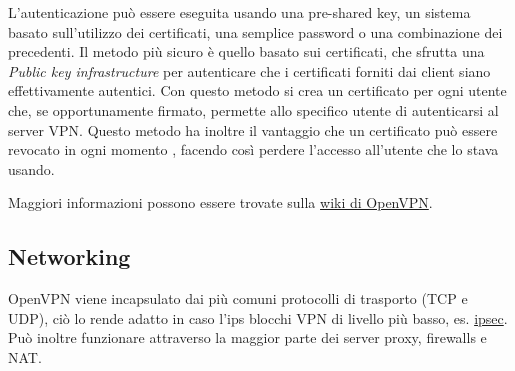 L'autenticazione può essere eseguita usando una pre-shared key, un sistema basato sull'utilizzo dei certificati, una semplice password o una combinazione dei precedenti. Il metodo più sicuro è quello basato sui certificati, che sfrutta una \textit{Public key infrastructure} \cite{pki} per autenticare che i certificati forniti dai client siano effettivamente autentici. Con questo metodo si crea un certificato per ogni utente che, se opportunamente firmato, permette allo specifico utente di autenticarsi al server VPN. Questo metodo ha inoltre il vantaggio che un certificato può essere revocato in ogni momento \cite{revoke-cert}, facendo così perdere l'accesso all'utente che lo stava usando. 

Maggiori informazioni possono essere trovate sulla \href{https://community.openvpn.net/openvpn/wiki/How_does_PKI_work}{wiki di OpenVPN}.

\subsection{Networking }
\label{subsec:openvpn-networking}

OpenVPN viene incapsulato dai più comuni protocolli di trasporto (TCP e UDP), ciò lo rende adatto in caso l'ips blocchi VPN di livello più basso, es. \href{https://en.wikipedia.org/wiki/IPsec}{ipsec}. Può inoltre funzionare attraverso la maggior parte dei server proxy, firewalls e NAT.

